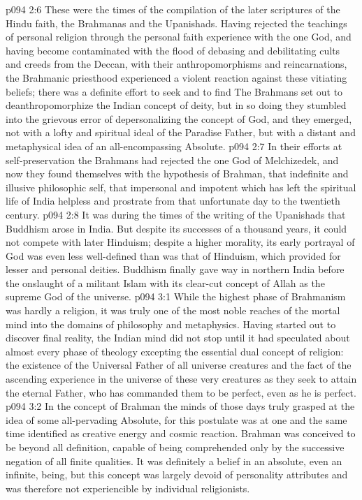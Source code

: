 \pc \vs p094 2:6 These were the times of the compilation of the later scriptures of the Hindu faith, the Brahmanas and the Upanishads. Having rejected the teachings of personal religion through the personal faith experience with the one God, and having become contaminated with the flood of debasing and debilitating cults and creeds from the Deccan, with their anthropomorphisms and reincarnations, the Brahmanic priesthood experienced a violent reaction against these vitiating beliefs; there was a definite effort to seek and to find  The Brahmans set out to deanthropomorphize the Indian concept of deity, but in so doing they stumbled into the grievous error of depersonalizing the concept of God, and they emerged, not with a lofty and spiritual ideal of the Paradise Father, but with a distant and metaphysical idea of an all\hyp{}encompassing Absolute.
\vs p094 2:7 In their efforts at self\hyp{}preservation the Brahmans had rejected the one God of Melchizedek, and now they found themselves with the hypothesis of Brahman, that indefinite and illusive philosophic self, that impersonal and impotent  which has left the spiritual life of India helpless and prostrate from that unfortunate day to the twentieth century.
\pc \vs p094 2:8 It was during the times of the writing of the Upanishads that Buddhism arose in India. But despite its successes of a thousand years, it could not compete with later Hinduism; despite a higher morality, its early portrayal of God was even less well\hyp{}defined than was that of Hinduism, which provided for lesser and personal deities. Buddhism finally gave way in northern India before the onslaught of a militant Islam with its clear\hyp{}cut concept of Allah as the supreme God of the universe.
\vs p094 3:1 While the highest phase of Brahmanism was hardly a religion, it was truly one of the most noble reaches of the mortal mind into the domains of philosophy and metaphysics. Having started out to discover final reality, the Indian mind did not stop until it had speculated about almost every phase of theology excepting the essential dual concept of religion: the existence of the Universal Father of all universe creatures and the fact of the ascending experience in the universe of these very creatures as they seek to attain the eternal Father, who has commanded them to be perfect, even as he is perfect.
\vs p094 3:2 In the concept of Brahman the minds of those days truly grasped at the idea of some all\hyp{}pervading Absolute, for this postulate was at one and the same time identified as creative energy and cosmic reaction. Brahman was conceived to be beyond all definition, capable of being comprehended only by the successive negation of all finite qualities. It was definitely a belief in an absolute, even an infinite, being, but this concept was largely devoid of personality attributes and was therefore not experiencible by individual religionists.
